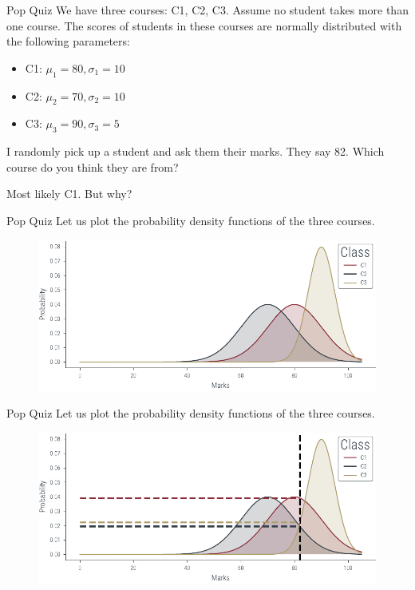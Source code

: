 \documentclass[handout]{beamer}
\begin{document}
\begin{frame}{Pop Quiz}
    We have three courses: C1, C2, C3. Assume no student takes more than one course.
    The scores of students in these courses are normally distributed with the following parameters:
    \begin{itemize}
        \item C1: $\mu_1 = 80, \sigma_1 = 10$
        \item C2: $\mu_2 = 70, \sigma_2 = 10$
        \item C3: $\mu_3 = 90, \sigma_3 = 5$
    \end{itemize}

   
    I randomly pick up a student and ask them their marks. They say 82. Which course do you think they are from?
    
    
    
    Most likely C1. But why?
    
\end{frame}

\begin{frame}{Pop Quiz}
    Let us plot the probability density functions of the three courses. 
    \begin{figure}
        \includegraphics[width=\textwidth]{../figures/mle/mle-example.pdf}
    \end{figure}
    
\end{frame}

\begin{frame}{Pop Quiz}
    Let us plot the probability density functions of the three courses. 
    \begin{figure}
        \includegraphics[width=\textwidth]{../figures/mle/mle-example-2.pdf}
    \end{figure}
    
\end{frame}
\end{document}

